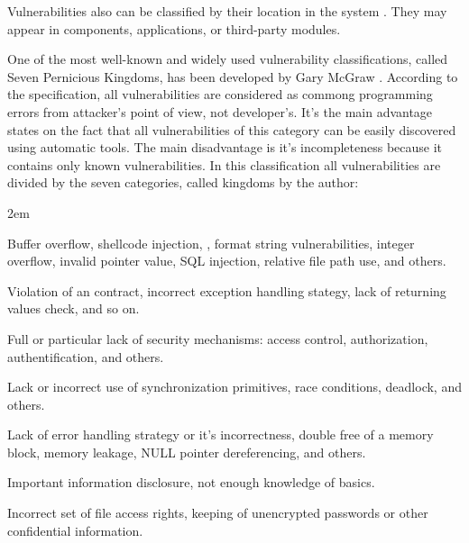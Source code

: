 %
Vulnerabilities also can be classified by their location in the system . 
%
They may appear in  components, applications, or third-party modules. 



%
One of the most well-known and widely used vulnerability classifications, called Seven Pernicious Kingdoms, has been developed by Gary McGraw   . 
%
According to the specification, all vulnerabilities are considered as commong programming errors from attacker's point of view, not developer's. 
%
It's the main advantage states on the fact that all vulnerabilities of this category can be easily discovered using automatic tools. 
%
The main disadvantage is it's incompleteness because it contains only known vulnerabilities. 
%
In this classification all vulnerabilities are divided by the seven categories, called kingdoms by the author: 
\begin{description}
	\leftskip2em%
	\setlength{\itemsep}{0pt}%
	\setlength{\parsep}{0pt}%

	\item[Input data check and representation.] Buffer overflow, shellcode injection, , format string vulnerabilities, integer overflow, invalid pointer value, SQL injection, relative file path use, and others. 

	\item[Improper API use.] Violation of an  contract, incorrect exception handling stategy, lack of returning values check, and so on.

	\item[Security mechanisms.] Full or particular lack of security mechanisms: access control, authorization, authentification, and others.

	\item[Time and state.] Lack or incorrect use of synchronization primitives, race conditions, deadlock, and others. 
	
	\item[Errors.] Lack of error handling strategy or it's incorrectness, double free of a memory block, memory leakage, NULL pointer dereferencing, and others.
	
	\item[Encapsulation.] Important information disclosure, not enough knowledge of  basics.
	
	\item[Software environment.] Incorrect set of file access rights, keeping of unencrypted passwords or other confidential information. 
\end{description}

